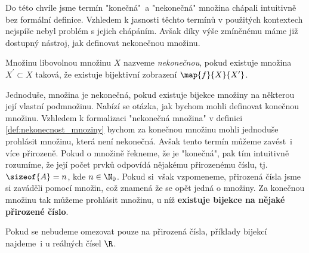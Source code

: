 Do této chvíle jsme termín "konečná"~a "nekonečná" množina chápali intuitivně bez formální definice. Vzhledem k jasnosti těchto termínů v použitých kontextech nejspíše nebyl problém s jejich chápáním. Avšak díky výše zmíněnému máme již dostupný nástroj, jak definovat nekonečnou množinu.
\begin{definition}\label{def:nekonecnost_mnoziny}
    Množinu libovolnou množinu $X$ nazveme \emph{nekonečnou}, pokud existuje množina $X^\prime\subset X$ taková, že existuje bijektivní zobrazení $\map{f}{X}{X^\prime}$. 
\end{definition}
Jednoduše, množina je nekonečná, pokud existuje bijekce množiny na některou její vlastní podmnožinu. Nabízí se otázka, jak bychom mohli definovat konečnou množinu. Vzhledem k formalizaci "nekonečná množina" v definici \ref{def:nekonecnost_mnoziny} bychom za konečnou množinu mohli jednoduše prohlásit množinu, která není nekonečná. Avšak tento termín můžeme zavést~i více přirozeně. Pokud o množině řekneme, že je "konečná", pak tím intuitivně rozumíme, že její počet prvků odpovídá nějakému přirozenému číslu, tj. $\sizeof{A}=n$, kde $n\in\N_0$. Pokud si~však vzpomeneme, přirozená čísla jsme si zaváděli pomocí množin, což znamená že se opět jedná o množiny. Za konečnou množinu tak můžeme prohlásit množinu, u níž \textbf{existuje bijekce na nějaké přirozené číslo}.\par
Pokud se nebudeme omezovat pouze na přirozená čísla, příklady bijekcí najdeme~i u reálných čísel $\R$.
